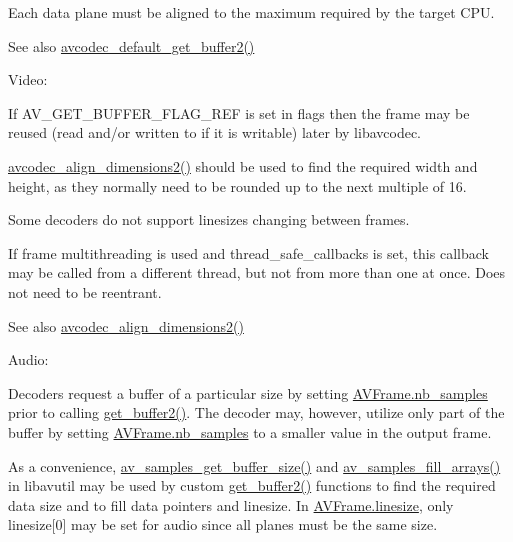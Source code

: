 Each data plane must be aligned to the maximum required by the target C\+PU.

\begin{DoxySeeAlso}{See also}
\hyperlink{group__lavc__decoding_ga09dee227d3666720eff1f6913d11699d}{avcodec\+\_\+default\+\_\+get\+\_\+buffer2()}
\end{DoxySeeAlso}
Video\+:

If A\+V\+\_\+\+G\+E\+T\+\_\+\+B\+U\+F\+F\+E\+R\+\_\+\+F\+L\+A\+G\+\_\+\+R\+EF is set in flags then the frame may be reused (read and/or written to if it is writable) later by libavcodec.

\hyperlink{group__lavc__decoding_ga34e3269dc1b9e2c98e9371241722e7e2}{avcodec\+\_\+align\+\_\+dimensions2()} should be used to find the required width and height, as they normally need to be rounded up to the next multiple of 16.

Some decoders do not support linesizes changing between frames.

If frame multithreading is used and thread\+\_\+safe\+\_\+callbacks is set, this callback may be called from a different thread, but not from more than one at once. Does not need to be reentrant.

\begin{DoxySeeAlso}{See also}
\hyperlink{group__lavc__decoding_ga34e3269dc1b9e2c98e9371241722e7e2}{avcodec\+\_\+align\+\_\+dimensions2()}
\end{DoxySeeAlso}
Audio\+:

Decoders request a buffer of a particular size by setting \hyperlink{struct_a_v_frame_a02f45ab8191aea1660159f1e464237ea}{A\+V\+Frame.\+nb\+\_\+samples} prior to calling \hyperlink{struct_a_v_codec_context_aef79333a4c6abf1628c55d75ec82bede}{get\+\_\+buffer2()}. The decoder may, however, utilize only part of the buffer by setting \hyperlink{struct_a_v_frame_a02f45ab8191aea1660159f1e464237ea}{A\+V\+Frame.\+nb\+\_\+samples} to a smaller value in the output frame.

As a convenience, \hyperlink{samplefmt_8h_aa7368bc4e3a366b688e81938ed55eb06}{av\+\_\+samples\+\_\+get\+\_\+buffer\+\_\+size()} and \hyperlink{samplefmt_8h_a673254a62fa75dab3211caf17c73c6eb}{av\+\_\+samples\+\_\+fill\+\_\+arrays()} in libavutil may be used by custom \hyperlink{struct_a_v_codec_context_aef79333a4c6abf1628c55d75ec82bede}{get\+\_\+buffer2()} functions to find the required data size and to fill data pointers and linesize. In \hyperlink{struct_a_v_frame_aa52bfc6605f6a3059a0c3226cc0f6567}{A\+V\+Frame.\+linesize}, only linesize\mbox{[}0\mbox{]} may be set for audio since all planes must be the same size.

